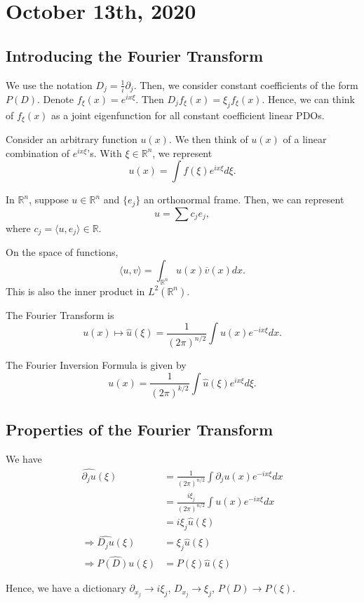 \documentclass[12pt]{scrartcl}
\newcommand{\R}{\mathbb{R}}
\renewcommand{\hat}{\widehat}
\begin{document}
\section{October 13th, 2020}
\subsection{Introducing the Fourier Transform}
We use the notation $D_j = \frac{1}{i}\partial_j$.  Then, we consider constant coefficients of the form $P(D)$.  Denote $f_{\xi}(x) = e^{ix \xi}$.  Then $D_j f_\xi(x) = \xi_j f_\xi(x)$.  Hence, we can think of $f_{\xi}(x)$ as a joint eigenfunction for all constant coefficient linear PDOs.

Consider an arbitrary function $u(x)$.  We then think of $u(x)$ of a linear combination of $e^{ix\xi}$'s.  With $\xi \in \R^n$, we represent 
$$u(x) = \int f(\xi)e^{ix\xi}d\xi.$$

In $\R^n$, suppose $u \in \R^n$ and $\{e_j\}$ an orthonormal frame.  Then, we can represent $$u = \sum c_je_j,$$
where $c_j = \langle u, e_j\rangle \in \R$.

On the space of functions, 
$$\langle u, v \rangle = \int_{\R^n} u(x) \overline{v}(x)dx.$$
This is also the inner product in $L^2(\R^n).$

\begin{definition} The Fourier Transform is $$u(x) \mapsto \hat{u}(\xi) = \frac{1}{(2\pi)^{n/2}}\int u(x) e^{-ix \xi}dx.$$  

The Fourier Inversion Formula is given by 
$$u(x) = \frac{1}{(2\pi)^{k/2}} \int \hat{u}(\xi)e^{ix \xi}d\xi.$$
\end{definition}

\subsection{Properties of the Fourier Transform}
We have 
\begin{align*}
\hat{\partial_j u}(\xi) &= \frac{1}{(2\pi)^{n/2}}\int \partial_j u(x)e^{-ix\xi}dx \\
&= \frac{i\xi_j}{(2\pi)^{n/2}}\int u(x)e^{-ix\xi} dx \\
&= i\xi_j\hat{u}(\xi) \\
\Rightarrow \hat{D_j u}(\xi) &=  \xi_j \hat{u}(\xi)\\
\Rightarrow \hat{P(D)u}(\xi) &= P(\xi)\hat{u}(\xi)
\end{align*}

Hence, we have a dictionary $\partial_{x_j} \rightarrow i\xi_j$, $D_{x_j} \to \xi_j$, $P(D) \to P(\xi)$.
\end{document}
